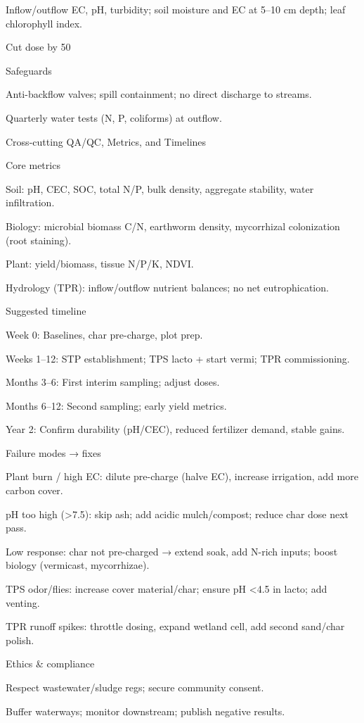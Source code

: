 \documentclass{article}
\begin{document}
Inflow/outflow EC, pH, turbidity; soil moisture and EC at 5–10 cm depth; leaf chlorophyll index.

Cut dose by 50%


Safeguards

Anti-backflow valves; spill containment; no direct discharge to streams.

Quarterly water tests (N, P, coliforms) at outflow.


Cross-cutting QA/QC, Metrics, and Timelines

Core metrics

Soil: pH, CEC, SOC, total N/P, bulk density, aggregate stability, water infiltration.

Biology: microbial biomass C/N, earthworm density, mycorrhizal colonization (root staining).

Plant: yield/biomass, tissue N/P/K, NDVI.

Hydrology (TPR): inflow/outflow nutrient balances; no net eutrophication.


Suggested timeline

Week 0: Baselines, char pre-charge, plot prep.

Weeks 1–12: STP establishment; TPS lacto + start vermi; TPR commissioning.

Months 3–6: First interim sampling; adjust doses.

Months 6–12: Second sampling; early yield metrics.

Year 2: Confirm durability (pH/CEC), reduced fertilizer demand, stable gains.


Failure modes → fixes

Plant burn / high EC: dilute pre-charge (halve EC), increase irrigation, add more carbon cover.

pH too high (>7.5): skip ash; add acidic mulch/compost; reduce char dose next pass.

Low response: char not pre-charged → extend soak, add N-rich inputs; boost biology (vermicast, mycorrhizae).

TPS odor/flies: increase cover material/char; ensure pH <4.5 in lacto; add venting.

TPR runoff spikes: throttle dosing, expand wetland cell, add second sand/char polish.


Ethics \& compliance

Respect wastewater/sludge regs; secure community consent.

Buffer waterways; monitor downstream; publish negative results.
\end{document}
